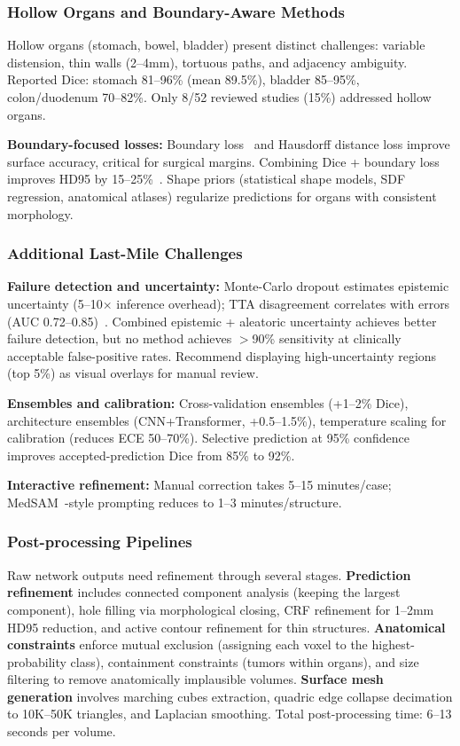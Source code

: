 \documentclass[conference]{IEEEtran}
\begin{document}
\subsubsection{Hollow Organs and Boundary-Aware Methods}

Hollow organs (stomach, bowel, bladder) present distinct challenges: variable distension, thin walls (2--4mm), tortuous paths, and adjacency ambiguity. Reported Dice: stomach 81--96\% (mean 89.5\%), bladder 85--95\%, colon/duodenum 70--82\%. Only 8/52 reviewed studies (15\%) addressed hollow organs.

\textbf{Boundary-focused losses:} Boundary loss~\cite{kervadec2019boundary} and Hausdorff distance loss improve surface accuracy, critical for surgical margins. Combining Dice + boundary loss improves HD95 by 15--25\%~\cite{kervadec2019boundary}. Shape priors (statistical shape models, SDF regression, anatomical atlases) regularize predictions for organs with consistent morphology.

\subsubsection{Additional Last-Mile Challenges}

\textbf{Failure detection and uncertainty:} Monte-Carlo dropout estimates epistemic uncertainty (5--10$\times$ inference overhead); TTA disagreement correlates with errors (AUC 0.72--0.85)~\cite{wang2019uncertainty}. Combined epistemic + aleatoric uncertainty achieves better failure detection, but no method achieves $>$90\% sensitivity at clinically acceptable false-positive rates. Recommend displaying high-uncertainty regions (top 5\%) as visual overlays for manual review.

\textbf{Ensembles and calibration:} Cross-validation ensembles (+1--2\% Dice), architecture ensembles (CNN+Transformer, +0.5--1.5\%), temperature scaling for calibration (reduces ECE 50--70\%). Selective prediction at 95\% confidence improves accepted-prediction Dice from 85\% to 92\%.

\textbf{Interactive refinement:} Manual correction takes 5--15 minutes/case; MedSAM~\cite{ma2024medsam}-style prompting reduces to 1--3 minutes/structure.

\subsubsection{Post-processing Pipelines}
\label{sec:postprocessing}

Raw network outputs need refinement through several stages. \textbf{Prediction refinement} includes connected component analysis (keeping the largest component), hole filling via morphological closing, CRF refinement for 1--2mm HD95 reduction, and active contour refinement for thin structures. \textbf{Anatomical constraints} enforce mutual exclusion (assigning each voxel to the highest-probability class), containment constraints (tumors within organs), and size filtering to remove anatomically implausible volumes. \textbf{Surface mesh generation} involves marching cubes extraction, quadric edge collapse decimation to 10K--50K triangles, and Laplacian smoothing. Total post-processing time: 6--13 seconds per volume.
\end{document}
